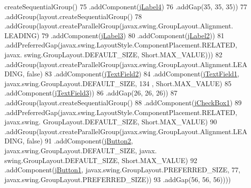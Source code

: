 \begin{DoxyCode}
      createSequentialGroup()
75                                 .addComponent(\mbox{\hyperlink{classsoftware_1_1_ingresar_preso_a5fb6376942dfd9a5ed07eb887918bea7}{jLabel4}})
76                                 .addGap(35, 35, 35))
77                             .addGroup(layout.createSequentialGroup()
78                                 .addGroup(layout.createParallelGroup(javax.swing.GroupLayout.Alignment.
      LEADING)
79                                     .addComponent(\mbox{\hyperlink{classsoftware_1_1_ingresar_preso_a83ed6c4480193eb6924a625e224524fd}{jLabel3}})
80                                     .addComponent(\mbox{\hyperlink{classsoftware_1_1_ingresar_preso_abdc8c3f8f7c224e30ff7c4b6c96d5f3f}{jLabel2}}))
81                                 .addPreferredGap(javax.swing.LayoutStyle.ComponentPlacement.RELATED, javax.
      swing.GroupLayout.DEFAULT\_SIZE, Short.MAX\_VALUE)))
82                         .addGroup(layout.createParallelGroup(javax.swing.GroupLayout.Alignment.LEADING, \textcolor{keyword}{
      false})
83                             .addComponent(\mbox{\hyperlink{classsoftware_1_1_ingresar_preso_a5f83b859ca7fb0ef832730e50082c083}{jTextField2}})
84                             .addComponent(\mbox{\hyperlink{classsoftware_1_1_ingresar_preso_ad9f61bb0c1750694824c000a899845cf}{jTextField1}}, javax.swing.GroupLayout.DEFAULT\_SIZE, 134
      , Short.MAX\_VALUE)
85                             .addComponent(\mbox{\hyperlink{classsoftware_1_1_ingresar_preso_a6e52c44f802c280a2154de10ed8679fb}{jTextField3}}))
86                         .addGap(26, 26, 26))
87                     .addGroup(layout.createSequentialGroup()
88                         .addComponent(\mbox{\hyperlink{classsoftware_1_1_ingresar_preso_af5dd1d64cebd5001a66aa292c76e6238}{jCheckBox1}})
89                         .addPreferredGap(javax.swing.LayoutStyle.ComponentPlacement.RELATED, javax.swing.
      GroupLayout.DEFAULT\_SIZE, Short.MAX\_VALUE)
90                         .addGroup(layout.createParallelGroup(javax.swing.GroupLayout.Alignment.LEADING, \textcolor{keyword}{
      false})
91                             .addComponent(\mbox{\hyperlink{classsoftware_1_1_ingresar_preso_a33ce6c95d87a5c987b9efde232b63e10}{jButton2}}, javax.swing.GroupLayout.DEFAULT\_SIZE, javax.
      swing.GroupLayout.DEFAULT\_SIZE, Short.MAX\_VALUE)
92                             .addComponent(\mbox{\hyperlink{classsoftware_1_1_ingresar_preso_a6c00105c7f9dbaf091e58501f2f32fb9}{jButton1}}, javax.swing.GroupLayout.PREFERRED\_SIZE, 77, 
      javax.swing.GroupLayout.PREFERRED\_SIZE))
93                         .addGap(56, 56, 56))))

\end{DoxyCode}
